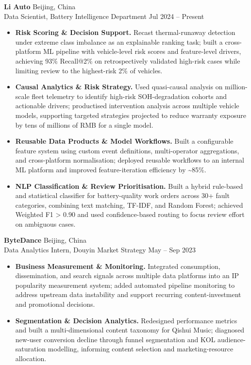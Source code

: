 \documentclass[a4paper,10pt]{article}
\begin{document}
\noindent\textbf{Li Auto} \hfill Beijing, China\\
Data Scientist, Battery Intelligence Department \hfill Jul 2024 -- Present
\begin{itemize}
    \item \textbf{Risk Scoring \& Decision Support.} Recast thermal-runaway detection under extreme class imbalance as an explainable ranking task; built a cross-platform ML pipeline with vehicle-level risk scores and feature-level drivers, achieving 93\% Recall@2\% on retrospectively validated high-risk cases while limiting review to the highest-risk 2\% of vehicles.

    \item \textbf{Causal Analytics \& Risk Strategy.} Used quasi-causal analysis on million-scale fleet telemetry to identify high-risk SOH-degradation cohorts and actionable drivers; productised intervention analysis across multiple vehicle models, supporting targeted strategies projected to reduce warranty exposure by tens of millions of RMB for a single model.

    \item \textbf{Reusable Data Products \& Model Workflows.} Built a configurable feature system using custom event definitions, multi-operator aggregations, and cross-platform normalisation; deployed reusable workflows to an internal ML platform and improved feature-iteration efficiency by \textasciitilde85\%.

    \item \textbf{NLP Classification \& Review Prioritisation.} Built a hybrid rule-based and statistical classifier for battery-quality work orders across 30+ fault categories, combining text matching, TF-IDF, and Random Forest; achieved Weighted F1 > 0.90 and used confidence-based routing to focus review effort on ambiguous cases.
\end{itemize}

\vspace{2pt}
\noindent\textbf{ByteDance} \hfill Beijing, China\\
Data Analytics Intern, Douyin Market Strategy \hfill May -- Sep 2023
\begin{itemize}
    \item \textbf{Business Measurement \& Monitoring.} Integrated consumption, dissemination, and search signals across multiple data platforms into an IP popularity measurement system; added automated pipeline monitoring to address upstream data instability and support recurring content-investment and promotional decisions.

    \item \textbf{Segmentation \& Decision Analytics.} Redesigned performance metrics and built a multi-dimensional content taxonomy for Qishui Music; diagnosed new-user conversion decline through funnel segmentation and KOL audience-saturation modelling, informing content selection and marketing-resource allocation.
\end{itemize}
\end{document}
